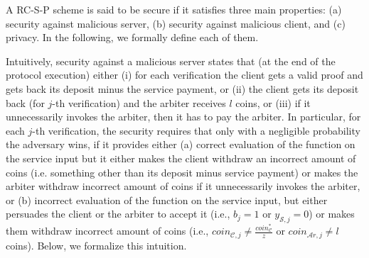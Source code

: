 \begin{definition}[RC-S-P Correctness]
\end{definition}


A RC-S-P scheme is said to be secure if it satisfies  three main properties: (a)  security against malicious server, (b) security against malicious client, and (c) privacy.  In the following, we formally define each of them.

 Intuitively, security against a malicious server states that (at the end of the protocol execution) either (i) for each verification the client gets a valid proof and gets back its deposit minus the service payment, or (ii) the client gets its deposit back (for $j$-th verification) and the arbiter receives $l$ coins, or (iii) if it unnecessarily invokes the arbiter, then it has to pay the arbiter. In particular, for each $j$-th verification, the security requires that only with a negligible probability the adversary wins, if it  provides either (a)  correct evaluation of the function on the service input but it either makes the client  withdraw an incorrect amount of coins (i.e. something other than its deposit minus service payment) or makes the arbiter withdraw incorrect amount of coins if it unnecessarily invokes the arbiter, or (b) incorrect evaluation of the function on the service input,  but either persuades the client or the arbiter to accept it (i.e.,  $b_{\scriptscriptstyle j}=1$ or $y_{\scriptscriptstyle\mathcal S,j}=0$) or makes them  withdraw incorrect amount of coins (i.e., $coin_{\scriptscriptstyle\mathcal{C},j}\neq \frac{coin_{\scriptscriptstyle\mathcal C}^{\scriptscriptstyle*}}{z}$ or  $coin_{\scriptscriptstyle\mathcal{A}r,j}\neq l$ coins).  Below, we formalize this intuition. 






